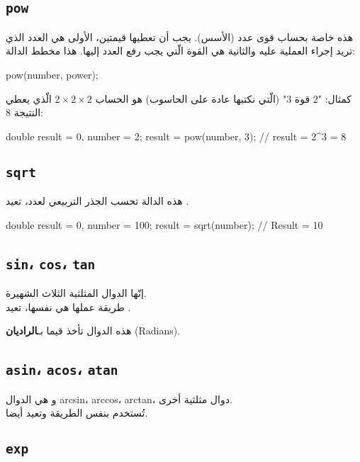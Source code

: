 \subsection{\texttt{pow}}

هذه خاصة بحساب قوى عدد (الأسس). يجب أن تعطيها قيمتين، الأولى هي العدد الذي تريد إجراء العملية عليه والثانية هي القوة الّتي يجب رفع العدد إليها. هذا مخطط الدالة:

\begin{Csource}
pow(number, power);
\end{Csource}

كمثال: "2 قوة 3" (الّتي نكتبها عادة
على الحاسوب) هو الحساب
$ 2 \times 2 \times 2 $
الّذي يعطي النتيجة 8:

\begin{Csource}
double result = 0, number = 2;
result = pow(number, 3); // result = 2^3 = 8
\end{Csource}

\subsection{\texttt{sqrt}}

هذه الدالة تحسب الجذر التربيعي لعدد، تعيد
.

\begin{Csource}
double result = 0, number = 100;
result = sqrt(number); // Result = 10
\end{Csource}

\subsection{\texttt{sin}، \texttt{cos}، \texttt{tan}}

إنّها الدوال المثلثية الثلاث الشهيرة.\\
طريقة عملها هي نفسها، تعيد
.

هذه الدوال تأخذ قيما بـ\textbf{الراديان}
(\textenglish{Radians}).

\subsection{\texttt{asin}، \texttt{acos}، \texttt{atan}}

و هي الدوال
\textenglish{arcsin}، \textenglish{arccos}، \textenglish{arctan}،
دوال مثلثية أخرى.\\
تُستخدم بنفس الطريقة وتعيد
أيضا.

\subsection{\texttt{exp}}

